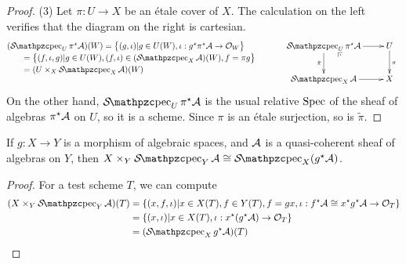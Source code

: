 \begin{proof}
   (3) Let $\pi:U\to X$ be an \'etale cover of $X$. The calculation on the left verifies
   that the diagram on the right is cartesian.
   \[\hspace{-1em}
   \begin{array}{cc}
     \begin{array}[t]{l}
       (\Spec_U \pi^\star \A)(W)= \bigl\{(g,\iota)|g\in U(W),
           \iota:g^\star\pi^\star\A\to \O_W\bigr\}\\[.5ex]
       \qquad= \bigl\{(f,\iota,g)|g\in U(W), (f,\iota)\in (\Spec_X\A)(W),
           f=\pi g\bigr\}\\[.5ex]
       \qquad= (U\times_X \Spec_X \A)(W)
     \end{array} \qquad&
     \xymatrix{
     \Spec_U \pi^\star\A \ar[r]\ar[d]_{\tilde\pi}\ar@{}[dr]|(.25)\pb & U\ar[d]^\pi\\
     \Spec_X \A \ar[r] & X}
   \end{array}\hspace{-3pt}\]
   On the other hand, $\Spec_U \pi^\star \A$ is the usual relative $\operatorname{Spec}$ of the sheaf
   of algebras $\pi^\star \mathcal{A}$ on $U$, so it is a scheme. Since $\pi$ is an \'etale
   surjection, so is $\tilde \pi$.
 \end{proof}
 \begin{lemma}\label{lec16L:SteinFactorization_pullback}
   If $g:X\to Y$ is a morphism of algebraic spaces, and $\mathcal{A}$ is a quasi-coherent sheaf of
   algebras on $Y$, then $X\times_Y \Spec_Y \A\cong \Spec_X(g^\star \A)$.
 \end{lemma}
 \begin{proof}
   For a test scheme $T$, we can compute
   \begin{align*}
     (X\times_Y \Spec_Y \A)(T)&= \{(x,f,\iota)|x\in X(T),f\in Y(T), f=gx,
     \iota:f^\star\A\cong x^\star g^\star \A\to \O_T\}\\
     &= \{(x,\iota)|x\in X(T), \iota:x^\star (g^\star \A)\to \O_T\}\\
     &= (\Spec_X g^\star \A)(T)\qedhere
   \end{align*}
 \end{proof}
